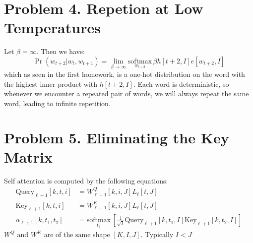 \documentclass{amsart}
\theoremstyle{definition}
\begin{document}
\section*{Problem 4. Repetion at Low Temperatures}
Let $\beta = \infty$. Then we have:
\[
\Pr(w_{t + 2} | w_{t}, w_{t + 1}) = \lim_{\beta \to \infty} \underset{w_{t + 2}}{\mathrm{softmax}}\,\beta h[t + 2, I] e[w_{t + 2}, I]
\]
which as seen in the first homework, is a one-hot distribution on the word with the highest inner product with $h[t + 2, I]$.
Each word is deterministic, so whenever we encounter a repeated pair of words, we will always repeat the same word, leading to infinite repetition.

\section*{Problem 5. Eliminating the Key Matrix}
Self attention is computed by the following equations:
\begin{align*}
    \mathrm{Query}_{\ell + 1} [k, t, i] &= W^Q_{\ell + 1}[k, i, J] L_{\ell}[t, J] \\
    \mathrm{Key}_{\ell + 1} [k, t, i] &= W^K_{\ell + 1}[k, i, J] L_{\ell}[t, J] \\
    \alpha_{\ell + 1} [k, t_1, t_2] &= \underset{t_2}{\mathrm{softmax}}\, \left[
        \frac1{\sqrt{I}} \mathrm{Query}_{\ell + 1} [k, t_1, I] \mathrm{Key}_{\ell + 1} [k, t_2, I]
    \right]
\end{align*}
$W^Q$ and $W^K$ are of the same shape $[K, I, J]$. Typically $I < J$
\end{document}
